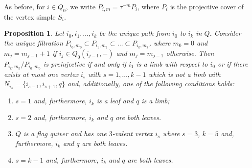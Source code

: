 \documentclass{amsart}
\newcommand{\sayT}[1]{\say[T]{#1}}
\newtheorem{proposition}[theorem]{Proposition}
\numberwithin{equation}{section}
\begin{document}
  As before, for $i\in Q_0$, we write $P_{i,m}=\tau^{-m}P_i$, where $P_i$ is the projective cover of the vertex simple $S_i$.  
  \begin{proposition}\label{pro: injective quotients}
	Let $i_0,i_1,\ldots,i_k$ be the unique path from $i_0$ to $i_k$ in $Q$.
    Consider the unique filtration $P_{i_0,m_0}\subset P_{i_1,m_1}\subset\ldots\subset P_{i_k,m_k}$, where $m_0=0$ and $m_j=m_{j-1}+1$ if $i_j\in Q_0(i_{j-1},-)$ and $m_j=m_{j-1}$ otherwise.
    Then $P_{i_k,m_k}/P_{i_0,m_0}$ is preinjective if and only if $i_1$ is a limb with respect to $i_0$ or if there exists at most one vertex $i_s$ with $s=1,\ldots, k-1$  which is not a limb with $N_{i_s}=\{i_{s-1},i_{s+1}, q\}$ and, additionally, one of the following conditions holds: 
		\begin{enumerate}
		
		\item $s=1$ and, furthermore, $i_k$ is a leaf and $q$ is a limb;
		\item $s=2$ and, furthermore, $i_k$ and $q$ are both leaves.
		\item $Q$ is a flag quiver and has one $3$-valent vertex $i_s$ where $s=3$, $k=5$ and, furthermore, $i_k$ and $q$ are both leaves. 
		\item $s=k-1$ and, furthermore, $i_k$ and $q$ are both leaves.
		\end{enumerate}
\end{proposition}
\end{document}
